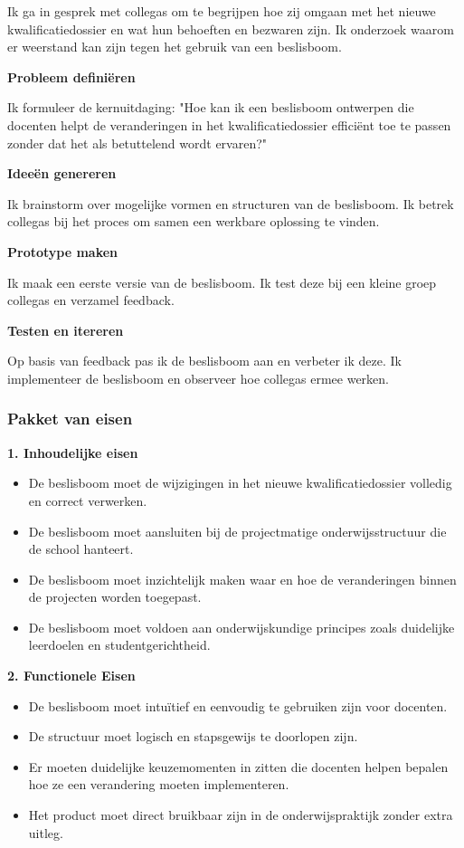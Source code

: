    Ik ga in gesprek met collega\textquotesingle s
 om te begrijpen hoe zij omgaan met het nieuwe kwalificatiedossier en wat hun behoeften en bezwaren zijn.
    Ik onderzoek waarom er weerstand kan zijn tegen het gebruik van een beslisboom.

\textbf{Probleem definiëren}

    Ik formuleer de kernuitdaging: "Hoe kan ik een beslisboom ontwerpen die docenten helpt de veranderingen in het kwalificatiedossier efficiënt toe te passen zonder dat het als betuttelend wordt ervaren?"

\textbf{Ideeën genereren}

    Ik brainstorm over mogelijke vormen en structuren van de beslisboom.
    Ik betrek collega\textquotesingle s
 bij het proces om samen een werkbare oplossing te vinden.

\textbf{Prototype maken}

    Ik maak een eerste versie van de beslisboom.
    Ik test deze bij een kleine groep collega\textquotesingle s
 en verzamel feedback.

\textbf{Testen en itereren}

    Op basis van feedback pas ik de beslisboom aan en verbeter ik deze.
    Ik implementeer de beslisboom en observeer hoe collega\textquotesingle s
 ermee werken.

\subsubsection{Pakket van eisen}    
\textbf{1. Inhoudelijke eisen}
\begin{itemize}
    \item De beslisboom moet de wijzigingen in het nieuwe kwalificatiedossier volledig en correct verwerken.
    \item De beslisboom moet aansluiten bij de projectmatige onderwijsstructuur die de school hanteert.
    \item De beslisboom moet inzichtelijk maken waar en hoe de veranderingen binnen de projecten worden toegepast.
    \item De beslisboom moet voldoen aan onderwijskundige principes zoals duidelijke leerdoelen en studentgerichtheid.
\end{itemize}

\textbf{2. Functionele Eisen}
\begin{itemize}
    \item De beslisboom moet intuïtief en eenvoudig te gebruiken zijn voor docenten.
    \item De structuur moet logisch en stapsgewijs te doorlopen zijn.
    \item Er moeten duidelijke keuzemomenten in zitten die docenten helpen bepalen hoe ze een verandering moeten implementeren.
    \item Het product moet direct bruikbaar zijn in de onderwijspraktijk zonder extra uitleg.
\end{itemize}

